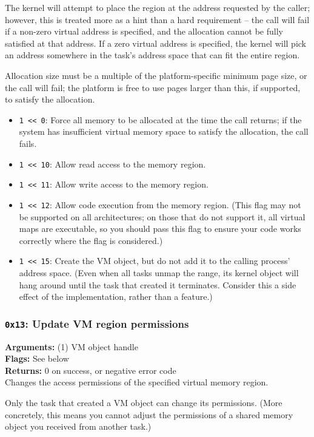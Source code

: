 \documentclass[11pt]{article}
\begin{document}
The kernel will attempt to place the region at the address requested by the caller; however, this is treated more as a hint than a hard requirement -- the call will fail if a non-zero virtual address is specified, and the allocation cannot be fully satisfied at that address. If a zero virtual address is specified, the kernel will pick an address somewhere in the task's address space that can fit the entire region.

Allocation size must be a multiple of the platform-specific minimum page size, or the call will fail; the platform is free to use pages larger than this, if supported, to satisfy the allocation.

\begin{itemize}
\item \texttt{1 << 0}: Force all memory to be allocated at the time the call returns; if the system has insufficient virtual memory space to satisfy the allocation, the call fails.
\item \texttt{1 << 10}: Allow read access to the memory region.
\item \texttt{1 << 11}: Allow write access to the memory region.
\item \texttt{1 << 12}: Allow code execution from the memory region. (This flag may not be supported on all architectures; on those that do not support it, all virtual maps are executable, so you should pass this flag to ensure your code works correctly where the flag is considered.)
\item \texttt{1 << 15}: Create the VM object, but do not add it to the calling process' address space. (Even when all tasks unmap the range, its kernel object will hang around until the task that created it terminates. Consider this a side effect of the implementation, rather than a feature.)
\end{itemize}

\subsubsection{{\tt 0x13}: Update VM region permissions}
\textbf{Arguments:} (1) VM object handle \\
\textbf{Flags:} See below \\
\textbf{Returns:} 0 on success, or negative error code \\

Changes the access permissions of the specified virtual memory region.

Only the task that created a VM object can change its permissions. (More concretely, this means you cannot adjust the permissions of a shared memory object you received from another task.)
\end{document}
